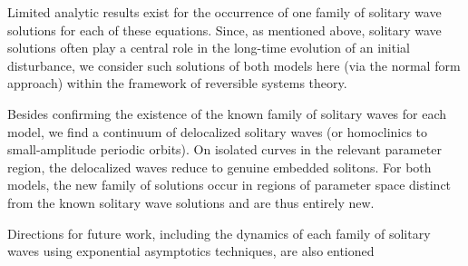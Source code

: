 Limited analytic results exist for the occurrence of one family
of  solitary wave solutions for each of these equations. Since, as
mentioned above, solitary wave solutions often play a central role in
the long-time evolution of an initial disturbance, we consider
such solutions of both models here (via the normal form approach)
within the framework of reversible systems theory.

Besides confirming
the existence of the known family of solitary waves for each model,
we find a continuum of delocalized solitary waves
(or homoclinics to small-amplitude periodic orbits).
On isolated curves in the relevant parameter region, the delocalized
waves reduce to genuine embedded solitons.
For both models, the new family of solutions occur in regions of
parameter space distinct from the known solitary wave solutions and
are thus entirely new.

Directions for future work, including the dynamics of each family of
solitary waves using exponential asymptotics techniques, are also entioned

